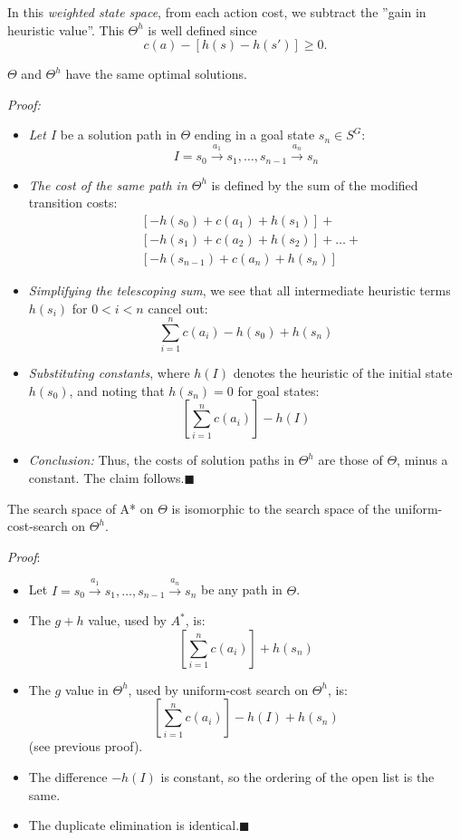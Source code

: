 \documentclass[10pt, letterpaper]{report}
\begin{document}
In this \textit{weighted state space}, from each action cost, we subtract the ''gain in heuristic value''. This $\Theta^h$ is well defined since 
$$c(a)-[h(s)-h(s')]\ge 0. $$
\begin{lemma2}\label{lemmaA}
    $\Theta$ and $\Theta^h$ have the same optimal solutions.
\end{lemma2}
\textit{Proof:} \begin{itemize}
    \item \textit{Let $I$} be a solution path in $\Theta$ ending in a goal state $s_n \in S^G$:
    \[
    I = s_0 \xrightarrow{a_1} s_1, \dots, s_{n-1} \xrightarrow{a_n} s_n
    \]
    \item \textit{The cost of the same path in $\Theta^h$} is defined by the sum of the modified transition costs:
    \begin{align*}
    & [-h(s_0) + c(a_1) + h(s_1)] + \\
    & [-h(s_1) + c(a_2) + h(s_2)] + \dots + \\
    & [-h(s_{n-1}) + c(a_n) + h(s_n)]
    \end{align*}
    \item \textit{Simplifying the telescoping sum}, we see that all intermediate heuristic terms $h(s_i)$ for $0 < i < n$ cancel out:
    \[
    \sum_{i=1}^{n} c(a_i) - h(s_0) + h(s_n)
    \]
    \item \textit{Substituting constants}, where $h(I)$ denotes the heuristic of the initial state $h(s_0)$, and noting that $h(s_n) = 0$ for goal states:
    \[
    \left[ \sum_{i=1}^{n} c(a_i) \right] - h(I)
    \]
    \item \textit{Conclusion:} Thus, the costs of solution paths in $\Theta^h$ are those of $\Theta$, minus a constant. The claim follows.\hfill$\blacksquare$
\end{itemize}
\begin{lemma2}\label{lemmaB}
    The search space of A* on $\Theta$ is isomorphic to the search space of the uniform-cost-search on $\Theta^h$.
\end{lemma2}
\textit{Proof}: \begin{itemize}
    \item Let $I = s_0 \xrightarrow{a_1} s_1, \dots, s_{n-1} \xrightarrow{a_n} s_n$ be any path in $\Theta$.
    \item The $g + h$ value, used by $A^*$, is:
    \[ \left[\sum_{i=1}^{n} c(a_i)\right] + h(s_n) \]
    \item The $g$ value in $\Theta^h$, used by uniform-cost search on $\Theta^h$, is:
    \[ \left[\sum_{i=1}^{n} c(a_i)\right] - h(I) + h(s_n) \]
    (see previous proof).
    \item The difference $-h(I)$ is constant, so the ordering of the open list is the same.
    \item The duplicate elimination is identical.\hfill$\blacksquare$
\end{itemize}
\end{document}
